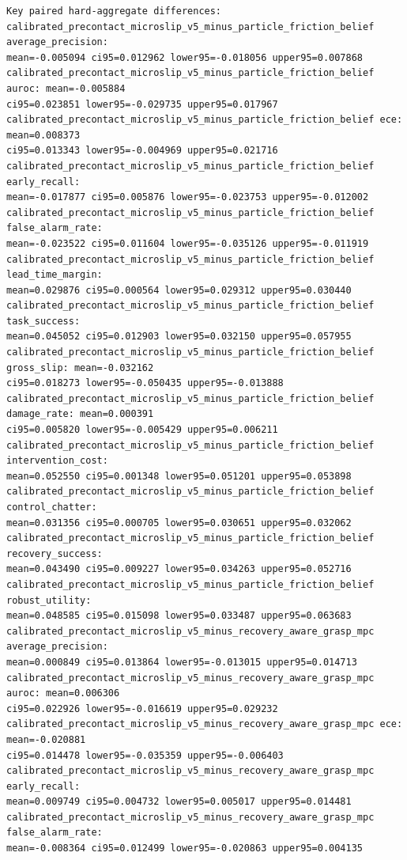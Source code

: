 \documentclass{article}
\begin{document}
\begin{tiny}
\begin{verbatim}
Key paired hard-aggregate differences:
calibrated_precontact_microslip_v5_minus_particle_friction_belief average_precision:
mean=-0.005094 ci95=0.012962 lower95=-0.018056 upper95=0.007868
calibrated_precontact_microslip_v5_minus_particle_friction_belief auroc: mean=-0.005884
ci95=0.023851 lower95=-0.029735 upper95=0.017967
calibrated_precontact_microslip_v5_minus_particle_friction_belief ece: mean=0.008373
ci95=0.013343 lower95=-0.004969 upper95=0.021716
calibrated_precontact_microslip_v5_minus_particle_friction_belief early_recall:
mean=-0.017877 ci95=0.005876 lower95=-0.023753 upper95=-0.012002
calibrated_precontact_microslip_v5_minus_particle_friction_belief false_alarm_rate:
mean=-0.023522 ci95=0.011604 lower95=-0.035126 upper95=-0.011919
calibrated_precontact_microslip_v5_minus_particle_friction_belief lead_time_margin:
mean=0.029876 ci95=0.000564 lower95=0.029312 upper95=0.030440
calibrated_precontact_microslip_v5_minus_particle_friction_belief task_success:
mean=0.045052 ci95=0.012903 lower95=0.032150 upper95=0.057955
calibrated_precontact_microslip_v5_minus_particle_friction_belief gross_slip: mean=-0.032162
ci95=0.018273 lower95=-0.050435 upper95=-0.013888
calibrated_precontact_microslip_v5_minus_particle_friction_belief damage_rate: mean=0.000391
ci95=0.005820 lower95=-0.005429 upper95=0.006211
calibrated_precontact_microslip_v5_minus_particle_friction_belief intervention_cost:
mean=0.052550 ci95=0.001348 lower95=0.051201 upper95=0.053898
calibrated_precontact_microslip_v5_minus_particle_friction_belief control_chatter:
mean=0.031356 ci95=0.000705 lower95=0.030651 upper95=0.032062
calibrated_precontact_microslip_v5_minus_particle_friction_belief recovery_success:
mean=0.043490 ci95=0.009227 lower95=0.034263 upper95=0.052716
calibrated_precontact_microslip_v5_minus_particle_friction_belief robust_utility:
mean=0.048585 ci95=0.015098 lower95=0.033487 upper95=0.063683
calibrated_precontact_microslip_v5_minus_recovery_aware_grasp_mpc average_precision:
mean=0.000849 ci95=0.013864 lower95=-0.013015 upper95=0.014713
calibrated_precontact_microslip_v5_minus_recovery_aware_grasp_mpc auroc: mean=0.006306
ci95=0.022926 lower95=-0.016619 upper95=0.029232
calibrated_precontact_microslip_v5_minus_recovery_aware_grasp_mpc ece: mean=-0.020881
ci95=0.014478 lower95=-0.035359 upper95=-0.006403
calibrated_precontact_microslip_v5_minus_recovery_aware_grasp_mpc early_recall:
mean=0.009749 ci95=0.004732 lower95=0.005017 upper95=0.014481
calibrated_precontact_microslip_v5_minus_recovery_aware_grasp_mpc false_alarm_rate:
mean=-0.008364 ci95=0.012499 lower95=-0.020863 upper95=0.004135

\end{verbatim}
\end{tiny}
\end{document}
